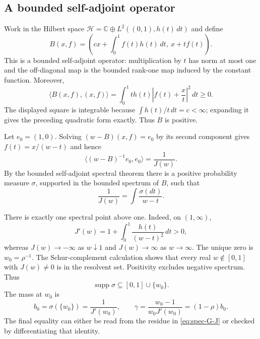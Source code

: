 \subsection{A bounded self-adjoint operator}

Work in the Hilbert space
$\mathcal H=\mathbb C\oplus L^2((0,1),h(t)\,dt)$ and define
\begin{equation}
 B(x,f)=\left(cx+\int_0^1f(t)h(t)\,dt,\ x+tf(t)\right).
 \label{eq:spec-operator}
\end{equation}
This is a bounded self-adjoint operator: multiplication by $t$ has
norm at most one and the off-diagonal map is the bounded rank-one
map induced by the constant function.  Moreover,
\begin{equation}
 \langle B(x,f),(x,f)\rangle
 =\int_0^1t h(t)\left|f(t)+\frac{x}{t}\right|^2\,dt\ge0.
 \label{eq:spec-positive}
\end{equation}
The displayed square is integrable because
$\int h(t)/t\,dt=c<\infty$; expanding it gives the preceding
quadratic form exactly.  Thus $B$ is positive.

Let $e_0=(1,0)$.  Solving $(w-B)(x,f)=e_0$ by its second component
gives $f(t)=x/(w-t)$ and hence
\begin{equation}
 \langle(w-B)^{-1}e_0,e_0\rangle=\frac1{J(w)}.
 \label{eq:spec-resolvent}
\end{equation}
By the bounded self-adjoint spectral theorem \cite{Teschl} there is a positive probability measure
$\sigma$, supported in the bounded spectrum of $B$, such that
\begin{equation}
 \frac1{J(w)}=\int\frac{\sigma(dt)}{w-t}.
 \label{eq:spec-measure}
\end{equation}

There is exactly one spectral point above one.  Indeed, on $(1,\infty)$,
\[
 J'(w)=1+\int_0^1\frac{h(t)}{(w-t)^2}\,dt>0,
\]
whereas $J(w)\to-\infty$ as $w\downarrow1$ and $J(w)\to\infty$
as $w\to\infty$.  The unique zero is $w_0=\rho^{-1}$.  The
Schur-complement calculation shows that every real $w\notin[0,1]$
with $J(w)\ne0$ is in the resolvent set.  Positivity excludes negative
spectrum.  Thus
\[
 \operatorname{supp}\sigma\subseteq[0,1]\cup\{w_0\}.
\]
The mass at $w_0$ is
\begin{equation}
 b_0=\sigma(\{w_0\})=\frac1{J'(w_0)},\qquad
 \gamma=\frac{w_0-1}{w_0J'(w_0)}=(1-\rho)b_0.
 \label{eq:spec-atom}
\end{equation}
The final equality can either be read from the residue in
\eqref{eq:spec-G-J} or checked by differentiating that identity.

